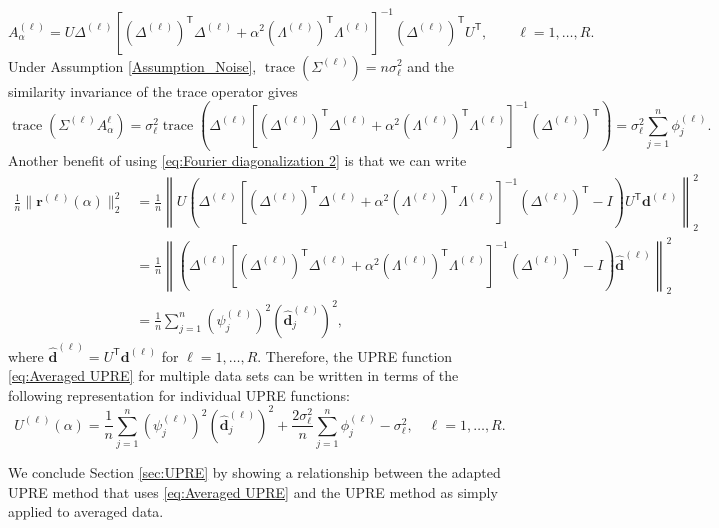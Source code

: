 \documentclass[12pt]{article}
\newcommand{\dVec}{\mathbf{d}}	%
\newcommand{\rVec}{\mathbf{r}}	%
\newcommand{\trans}[1]{{#1}^\mathsf{T}}	%
\DeclareMathOperator{\trace}{trace}		%
\newcommand{\dft}[1]{\widehat{#1}}	%
\newcommand{\regparam}{\alpha}
\newcommand{\filt}{\phi}
\newcommand{\mfilt}{\psi}
\newcommand{\noiseSD}{\sigma}	%
\newcommand{\A}{A_{\regparam}}	%
\newcommand{\U}{U}	%
\begin{document}
\begin{equation}
\label{eq:Fourier diagonalization 2}
\A^{(\ell)} = U\Delta^{(\ell)}\left[\trans{(\Delta^{(\ell)})}\Delta^{(\ell)} + \regparam^2\trans{(\Lambda^{(\ell)})}\Lambda^{(\ell)}\right]^{-1}\trans{(\Delta^{(\ell)})}\trans{U}, \qquad \ell = 1,\ldots,R.
\end{equation}
Under Assumption \ref{Assumption_Noise}, $\trace(\Sigma^{(\ell)}) = n\noiseSD^2_\ell$ and the similarity invariance of the trace operator gives
\begin{equation}
\label{eq:Trace}
\trace\left(\Sigma^{(\ell)}\A^{\ell}\right) = \noiseSD_\ell^2 \trace\left(\Delta^{(\ell)}\left[\trans{(\Delta^{(\ell)})}\Delta^{(\ell)} + \regparam^2\trans{(\Lambda^{(\ell)})}\Lambda^{(\ell)}\right]^{-1}\trans{(\Delta^{(\ell)})}\right) = \noiseSD_\ell^2 \sum_{j=1}^{n} \filt^{(\ell)}_j.
\end{equation}
Another benefit of using \eqref{eq:Fourier diagonalization 2} is that we can write
\begin{align}
\frac{1}{n}\|\rVec^{(\ell)}(\regparam)\|_2^2 &= \frac{1}{n}\left\|U\left(\Delta^{(\ell)}\left[\trans{(\Delta^{(\ell)})}\Delta^{(\ell)} + \regparam^2\trans{(\Lambda^{(\ell)})}\Lambda^{(\ell)}\right]^{-1}\trans{(\Delta^{(\ell)})} - I\right)\trans{U}\dVec^{(\ell)}\right\|_2^2 \nonumber \\
&= \frac{1}{n}\left\|\left(\Delta^{(\ell)}\left[\trans{(\Delta^{(\ell)})}\Delta^{(\ell)} + \regparam^2\trans{(\Lambda^{(\ell)})}\Lambda^{(\ell)}\right]^{-1}\trans{(\Delta^{(\ell)})} - I\right)\dft{\dVec}^{(\ell)}\right\|_2^2 \nonumber \\
&= \frac{1}{n}\sum_{j=1}^{n} \left(\mfilt^{(\ell)}_j\right)^2\left(\dft{\dVec}_j^{(\ell)}\right)^2,
\label{eq:Fourier regularized residual}
\end{align}
where $\dft{\dVec}^{(\ell)} = \trans{U}\dVec^{(\ell)}$ for $\ell = 1,\ldots,R$. Therefore, the UPRE function \eqref{eq:Averaged UPRE} for multiple data sets can be written in terms of the following representation for individual UPRE functions:
\begin{equation}
\label{eq:Individual UPRE 2}
\U^{(\ell)}(\regparam) = \frac{1}{n} \sum_{j=1}^{n} \left(\mfilt^{(\ell)}_j\right)^2\left(\dft{\dVec}_j^{(\ell)}\right)^2 + \frac{2\noiseSD^2_\ell}{n} \sum_{j=1}^{n} \filt^{(\ell)}_j - \noiseSD^2_\ell, \quad \ell = 1,\ldots,R.
\end{equation}

We conclude Section \ref{sec:UPRE} by showing a relationship between the adapted UPRE method that uses \eqref{eq:Averaged UPRE} and the UPRE method as simply applied to averaged data. 
\end{document}
